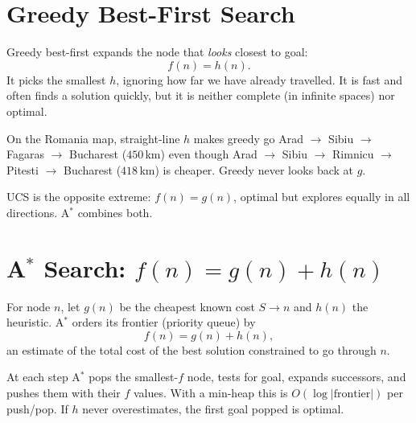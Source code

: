 \section{Greedy Best-First Search}
Greedy best-first expands the node that \emph{looks} closest to goal:
\[
  f(n)=h(n).
\]
It picks the smallest $h$, ignoring how far we have already travelled. It is fast and often finds a solution quickly, but it is neither complete (in infinite spaces) nor optimal.

\begin{example}
On the Romania map, straight-line $h$ makes greedy go Arad $\to$ Sibiu $\to$ Fagaras $\to$ Bucharest ($450$\,km) even though Arad $\to$ Sibiu $\to$ Rimnicu $\to$ Pitesti $\to$ Bucharest ($418$\,km) is cheaper. Greedy never looks back at $g$.
\end{example}

UCS is the opposite extreme: $f(n)=g(n)$, optimal but explores equally in all directions. \textsc{A}$^{*}$ combines both.

\section{A\texorpdfstring{$^{*}$}{*} Search: \texorpdfstring{$f(n)=g(n)+h(n)$}{f(n)=g(n)+h(n)}}
\begin{definition}[A$^{*}$ evaluation]
For node $n$, let $g(n)$ be the cheapest known cost $S\to n$ and $h(n)$ the heuristic. A$^{*}$ orders its frontier (priority queue) by
\[
  f(n)=g(n)+h(n),
\]
an estimate of the total cost of the best solution constrained to go through $n$.
\end{definition}
At each step A$^{*}$ pops the smallest-$f$ node, tests for goal, expands successors, and pushes them with their $f$ values. With a min-heap this is $O(\log |\text{frontier}|)$ per push/pop. If $h$ never overestimates, the first goal popped is optimal.

